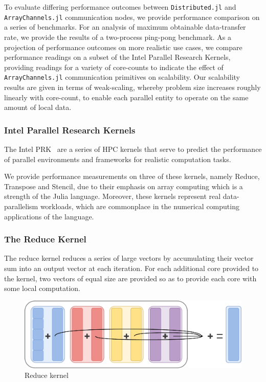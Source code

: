 \documentclass{juliacon}
\begin{document}
To evaluate differing performance outcomes between
\texttt{Distributed.jl} and \texttt{ArrayChannels.jl} communication
nodes, we provide performance comparison on a series of benchmarks. For
an analysis of maximum obtainable data-transfer rate, we provide the
results of a two-process ping-pong benchmark. As a projection of
performance outcomes on more realistic use cases, we compare performance
readings on a subset of the Intel Parallel Research Kernels, providing
readings for a variety of core-counts to indicate the effect of
\texttt{ArrayChannels.jl} communication primitives on scalability. Our
scalability results are given in terms of weak-scaling, whereby problem
size increases roughly linearly with core-count, to enable each parallel
entity to operate on the same amount of local data.

\subsubsection{Intel Parallel Research Kernels}
\label{sec:intel-prk}

The Intel PRK~\cite{Wijngaart} are a series of HPC
kernels that serve to predict the performance of parallel environments
and frameworks for realistic computation tasks.

We provide performance measurements on three of these kernels, namely
Reduce, Transpose and Stencil, due to their emphasis on array computing
which is a strength of the Julia language. Moreover, these kernels
represent real data-parallelism workloads, which are commonplace in the
numerical computing applications of the language.

\subsubsection{The Reduce Kernel}

The reduce kernel reduces a series of large vectors by accumulating
their vector sum into an output vector at each iteration. For each
additional core provided to the kernel, two vectors of equal size are
provided so as to provide each core with some local computation.

\begin{figure}[htb]
	\includegraphics[width=\linewidth]{figs/Reduce.pdf}
	\caption{Reduce kernel}
	\label{fig:reduce-diagram}
\end{figure}
\end{document}
